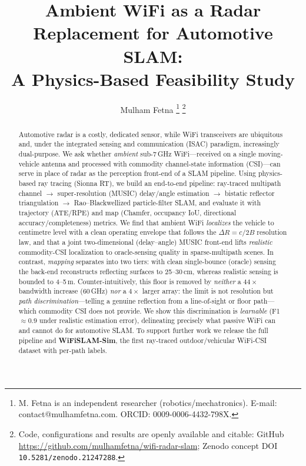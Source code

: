 \documentclass[journal]{IEEEtran}
\newcommand{\SI}[2]{#1\,#2}
\newcommand{\SIrange}[3]{#1--#2\,#3}
\begin{document}
\title{Ambient WiFi as a Radar Replacement for Automotive SLAM:\\
A Physics-Based Feasibility Study}

\author{Mulham Fetna%
\thanks{M. Fetna is an independent researcher (robotics/mechatronics).
E-mail: contact@mulhamfetna.com. ORCID: 0009-0006-4432-798X.}%
\thanks{Code, configurations and results are openly available and citable:
GitHub \url{https://github.com/mulhamfetna/wifi-radar-slam};
Zenodo concept DOI \texttt{10.5281/zenodo.21247288}.}}

\maketitle

\begin{abstract}
Automotive radar is a costly, dedicated sensor, while WiFi transceivers are
ubiquitous and, under the integrated sensing and communication (ISAC) paradigm,
increasingly dual-purpose. We ask whether \emph{ambient} sub-\SI{7}{GHz}
WiFi---received on a single moving-vehicle antenna and processed with commodity
channel-state information (CSI)---can serve in place of radar as the perception
front-end of a SLAM pipeline. Using physics-based ray tracing (Sionna RT), we
build an end-to-end pipeline: ray-traced multipath channel $\rightarrow$
super-resolution (MUSIC) delay/angle estimation $\rightarrow$ bistatic reflector
triangulation $\rightarrow$ Rao--Blackwellized particle-filter SLAM, and evaluate
it with trajectory (ATE/RPE) and map (Chamfer, occupancy IoU, directional
accuracy/completeness) metrics. We find that ambient WiFi \emph{localizes} the
vehicle to centimetre level with a clean operating envelope that follows the
$\Delta R = c/2B$ resolution law, and that a joint two-dimensional (delay--angle)
MUSIC front-end lifts \emph{realistic} commodity-CSI localization to
oracle-sensing quality in sparse-multipath scenes. In contrast, \emph{mapping}
separates into two tiers: with clean single-bounce (oracle) sensing the back-end
reconstructs reflecting surfaces to \SIrange{25}{30}{cm}, whereas realistic
sensing is bounded to \SIrange{4}{5}{m}. Counter-intuitively, this floor is
removed by \emph{neither} a $44\times$ bandwidth increase (\SI{60}{GHz}) \emph{nor}
a $4\times$ larger array: the limit is not resolution but \emph{path
discrimination}---telling a genuine reflection from a line-of-sight or floor
path---which commodity CSI does not provide. We show this discrimination is
\emph{learnable} (F1~$\approx0.9$ under realistic estimation error), delineating
precisely what passive WiFi can and cannot do for automotive SLAM. To support
further work we release the full pipeline and \textbf{WiFiSLAM-Sim}, the first
ray-traced outdoor/vehicular WiFi-CSI dataset with per-path labels.
\end{abstract}
\end{document}
